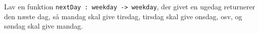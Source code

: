 Lav en funktion \lstinline{nextDay : weekday -> weekday}, der givet
en ugedag returnerer den næste dag, så mandag skal give tirsdag,
tirsdag skal give onsdag, osv, og søndag skal give mandag.

